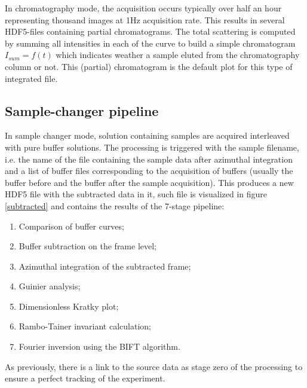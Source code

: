 \documentclass[preprint]{iucr}              %
\begin{document}
In chromatography mode, the acquisition occurs typically over half an hour representing thousand images at 1Hz acquisition rate. 
This results in several HDF5-files containing partial chromatograms.
The total scattering is computed by summing all intensities in each of the curve to build a simple chromatogram $I_{sum} = f(t)$ 
which indicates weather a sample eluted from the chromatography column or not. 
This (partial) chromatogram is the default plot for this type of integrated file.

\subsection{Sample-changer pipeline}
In sample changer mode, solution containing samples are acquired interleaved with pure buffer solutions.
The processing is triggered with the sample filename, i.e. the name of the file containing the sample data after azimuthal integration and a list of 
buffer files corresponding to the acquisition of buffers (usually the buffer before and the buffer after the sample acquisition). 
This produces a new HDF5 file with the subtracted data in it, such file is visualized in figure \ref{subtracted}
and contains the results of the 7-stage pipeline: 
\begin{enumerate}
    \item Comparison of buffer curves;
    \item Buffer subtraction on the frame level;
    \item Azimuthal integration of the subtracted frame;
    \item Guinier analysis;
    \item Dimensionless Kratky plot;
    \item Rambo-Tainer invariant calculation;
    \item Fourier inversion using the BIFT algorithm.
\end{enumerate}
As previously, there is a link to the source data as stage zero of the processing to ensure a perfect tracking of the experiment.
\end{document}
